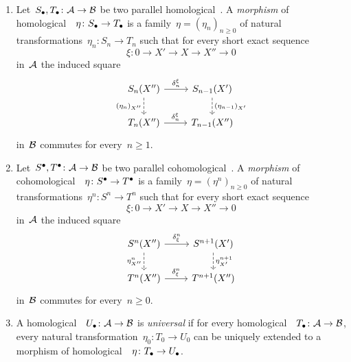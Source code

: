 \begin{definition}
  \leavevmode
  \begin{enumerate}
    \item
      Let~$S_\bullet, T_\bullet \colon \mathcal{A} \to \mathcal{B}$ be two parallel homological~{\deltafuns}.
      A \emph{morphism} of homological~{\deltafun}~$\eta \colon S_\bullet \to T_\bullet$ is a family~$\eta = (\eta_n)_{n \geq 0}$ of natural transformations~$\eta_n \colon S_n \to T_n$ such that for every short exact sequence
      \[
        \xi
        \colon
        0
        \to
        X'
        \to
        X
        \to
        X''
        \to
        0
      \]
      in~$\mathcal{A}$ the induced square
      \[
        \begin{tikzcd}
            S_n(X'')
            \arrow{r}[above]{\delta^\xi_n}
            \arrow[dashed]{d}[left]{(\eta_n)_{X''}}
          & S_{n-1}(X')
            \arrow[dashed]{d}[right]{(\eta_{n-1})_{X'}}
          \\
            T_n(X'')
            \arrow{r}[above]{\delta^\xi_n}
          & T_{n-1}(X'')
        \end{tikzcd}
      \]
      in~$\mathcal{B}$ commutes for every~$n \geq 1$.
    \item
      Let~$S^\bullet, T^\bullet \colon \mathcal{A} \to \mathcal{B}$ be two parallel cohomological~{\deltafuns}.
      A \emph{morphism} of cohomological~{\deltafun}~$\eta \colon S^\bullet \to T^\bullet$ is a family~$\eta = (\eta^n)_{n \geq 0}$ of natural transformations~$\eta^n \colon S^n \to T^n$ such that for every short exact sequence
      \[
        \xi
        \colon
        0
        \to
        X'
        \to
        X
        \to
        X''
        \to
        0
      \]
      in~$\mathcal{A}$ the induced square
      \[
        \begin{tikzcd}
            S^n(X'')
            \arrow{r}[above]{\delta_\xi^n}
            \arrow[dashed]{d}[left]{\eta^n_{X''}}
          & S^{n+1}(X')
            \arrow[dashed]{d}[right]{\eta^{n+1}_{X'}}
          \\
            T^n(X'')
            \arrow{r}[above]{\delta_\xi^n}
          & T^{n+1}(X'')
        \end{tikzcd}
      \]
      in~$\mathcal{B}$ commutes for every~$n \geq 0$.
    \item
      A homological~{\deltafun}~$U_\bullet \colon \mathcal{A} \to \mathcal{B}$ is \emph{universal} if for every homological~{\deltafun}~$T_\bullet \colon \mathcal{A} \to \mathcal{B}$, every natural transformation~$\eta_0 \colon T_0 \to U_0$ can be uniquely extended to a morphism of homological~{\deltafuns}~$\eta \colon T_\bullet \to U_\bullet$.

\end{enumerate}
\end{definition}
